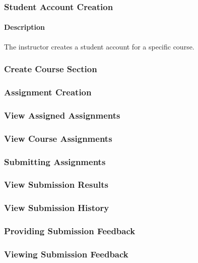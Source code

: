 \documentclass{article}
\begin{document}
\subsubsection{Student Account Creation}

\paragraph{Description} The instructor creates a student account for a specific course.


\subsubsection{Create Course Section}

\subsubsection{Assignment Creation}


\subsubsection{View Assigned Assignments}

\subsubsection{View Course Assignments}


\subsubsection{Submitting Assignments}


\subsubsection{View Submission Results}

\subsubsection{View Submission History}

\subsubsection{Providing Submission Feedback}

\subsubsection{Viewing Submission Feedback}
\end{document}
